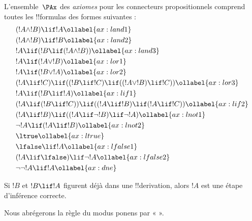 \documentclass[../../../include/open-logic-section]{subfiles}
\begin{document}
      {}
      {}


\begin{defn}[Axiomes]
L'ensemble~$\PAx$ des \emph{axiomes} pour les connecteurs
propositionnels comprend toutes les !!{formula}s des formes suivantes :
\begin{align}
  & (!A \land !B) \lif !A \ollabel{ax:land1}\\
  & (!A \land !B) \lif !B \ollabel{ax:land2}\\
  & !A \lif (!B \lif (!A \land !B)) \ollabel{ax:land3}\\
  & !A \lif (!A \lor !B) \ollabel{ax:lor1}\\
  & !A \lif (!B \lor !A) \ollabel{ax:lor2}\\
  & (!A \lif !C) \lif ((!B \lif !C) \lif ((!A \lor !B) \lif !C)) \ollabel{ax:lor3}\\
  & !A \lif (!B \lif !A) \ollabel{ax:lif1}\\
  & (!A \lif (!B \lif !C)) \lif ((!A \lif !B) \lif (!A \lif !C)) \ollabel{ax:lif2}\\
  & (!A \lif !B) \lif ((!A \lif \lnot !B) \lif \lnot !A) \ollabel{ax:lnot1}\\
  & \lnot !A \lif (!A \lif !B) \ollabel{ax:lnot2}\\
  & \ltrue \ollabel{ax:ltrue}\\
  & \lfalse \lif !A \ollabel{ax:lfalse1}\\
  & (!A \lif \lfalse) \lif \lnot !A \ollabel{ax:lfalse2}\\
  & \lnot\lnot !A \lif !A \ollabel{ax:dne}
\end{align}
\end{defn}

\begin{defn}
  Si $!B$ et $!B \lif !A$ figurent déjà dans une !!{derivation}, alors
  $!A$ est une étape d'inférence correcte.
\end{defn}

Nous abrégerons la règle du modus ponens par « \MP{} ».
\end{document}
